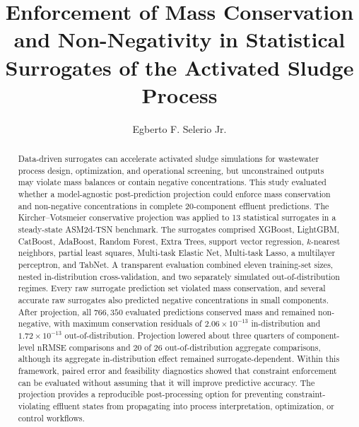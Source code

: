 \documentclass[a4paper,fleqn]{cas-sc}
\begin{document}
\let\WriteBookmarks\relax
\def\floatpagepagefraction{1}
\def\textpagefraction{.001}


\title[mode=title]{Enforcement of Mass Conservation and Non-Negativity in Statistical Surrogates of the Activated Sludge Process}

\author[1]{Egberto F. Selerio Jr.}
\cormark[1]



\begin{abstract}
Data-driven surrogates can accelerate activated sludge simulations for wastewater process design, optimization, and operational screening, but unconstrained outputs may violate mass balances or contain negative concentrations. This study evaluated whether a model-agnostic post-prediction projection could enforce mass conservation and non-negative concentrations in complete 20-component effluent predictions. The Kircher--Votsmeier conservative projection was applied to 13 statistical surrogates in a steady-state ASM2d-TSN benchmark. The surrogates comprised XGBoost, LightGBM, CatBoost, AdaBoost, Random Forest, Extra Trees, support vector regression, $k$-nearest neighbors, partial least squares, Multi-task Elastic Net, Multi-task Lasso, a multilayer perceptron, and TabNet. A transparent evaluation combined eleven training-set sizes, nested in-distribution cross-validation, and two separately simulated out-of-distribution regimes. Every raw surrogate prediction set violated mass conservation, and several accurate raw surrogates also predicted negative concentrations in small components. After projection, all $766{,}350$ evaluated predictions conserved mass and remained non-negative, with maximum conservation residuals of $2.06\times10^{-13}$ in-distribution and $1.72\times10^{-13}$ out-of-distribution. Projection lowered about three quarters of component-level nRMSE comparisons and 20 of 26 out-of-distribution aggregate comparisons, although its aggregate in-distribution effect remained surrogate-dependent. Within this framework, paired error and feasibility diagnostics showed that constraint enforcement can be evaluated without assuming that it will improve predictive accuracy. The projection provides a reproducible post-processing option for preventing constraint-violating effluent states from propagating into process interpretation, optimization, or control workflows.
\end{abstract}
\end{document}

